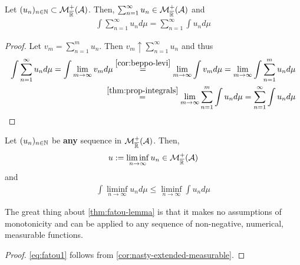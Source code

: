 \begin{cor}
	\label{cor:integral-countable-sum}
	Let $(u_n)_{n\in\mathbb{N}} \subset \mathcal{M}^+_{\overline{\mathbb{R}}}(\mathcal{A})$. Then, $\sum_{n = 1}^{\infty} u_n \in \mathcal{M}_{\overline{\mathbb{R}}}^+(\mathcal{A})$ and
	\begin{align}
		\int \sum_{n = 1}^\infty u_n d\mu = \sum_{n = 1}^\infty \int u_n d\mu
	\end{align}
\end{cor}

\begin{proof}
	Let $v_m = \sum_{n=1}^{m} u_n$. Then $v_m \uparrow \sum_{n=1}^{\infty} u_n$ and thus
	\begin{align*}
		\int \sum_{n = 1}^\infty u_n d\mu
		= \int \lim_{m \to \infty} v_m d\mu
		\overset{\ref{cor:beppo-levi}}{=} \lim_{m \to \infty} \int v_m d\mu
		= \lim_{m \to \infty} \int \sum_{n = 1}^m u_n d\mu \\
		\overset{\ref{thm:prop-integrals}}{=} \lim_{m \to \infty} \sum_{n=1}^{m} \int u_n d\mu
		= \sum_{n = 1}^\infty \int u_n d\mu
	\end{align*}
\end{proof}

\begin{thm}
	\label{thm:fatou-lemma}
	Let $(u_n)_{n\in\mathbb{N}}$ be \textbf{any} sequence in $\mathcal{M}_{\overline{\mathbb{R}}}^+(\mathcal{A})$. Then,
	\begin{align}
		\label{eq:fatou1}
		u := \liminf_{n\to \infty} u_n \in \mathcal{M}_{\overline{\mathbb{R}}}^+(\mathcal{A})
	\end{align}
	and
	\begin{align}
		\int \liminf_{n\to \infty} u_n d\mu \leq \liminf_{n\to \infty} \int u_n d\mu
	\end{align}
\end{thm}

The great thing about \autoref{thm:fatou-lemma} is that it makes no assumptions of monotonicity and can be applied to any sequence of non-negative, numerical, measurable functions.

\begin{proof}
	\autoref{eq:fatou1} follows from \autoref{cor:nasty-extended-measurable}.
\end{proof}